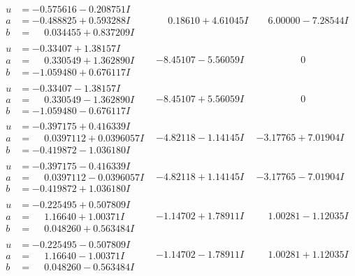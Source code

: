 \documentclass[1p]{elsarticle_modified}
\theoremstyle{definition}
\begin{document}
$$\begin{array}{c|c|c}
\begin{aligned}
u &= -0.575616 - 0.208751 I \\
a &= -0.488825 + 0.593288 I \\
b &= \phantom{-}0.034455 + 0.837209 I\end{aligned}
 & \phantom{-}0.18610 + 4.61045 I & \phantom{-}6.00000 - 7.28544 I \\ \hline\begin{aligned}
u &= -0.33407 + 1.38157 I \\
a &= \phantom{-}0.330549 + 1.362890 I \\
b &= -1.059480 + 0.676117 I\end{aligned}
 & -8.45107 - 5.56059 I & \phantom{-0.000000 } 0 \\ \hline\begin{aligned}
u &= -0.33407 - 1.38157 I \\
a &= \phantom{-}0.330549 - 1.362890 I \\
b &= -1.059480 - 0.676117 I\end{aligned}
 & -8.45107 + 5.56059 I & \phantom{-0.000000 } 0 \\ \hline\begin{aligned}
u &= -0.397175 + 0.416339 I \\
a &= \phantom{-}0.0397112 + 0.0396057 I \\
b &= -0.419872 - 1.036180 I\end{aligned}
 & -4.82118 - 1.14145 I & -3.17765 + 7.01904 I \\ \hline\begin{aligned}
u &= -0.397175 - 0.416339 I \\
a &= \phantom{-}0.0397112 - 0.0396057 I \\
b &= -0.419872 + 1.036180 I\end{aligned}
 & -4.82118 + 1.14145 I & -3.17765 - 7.01904 I \\ \hline\begin{aligned}
u &= -0.225495 + 0.507809 I \\
a &= \phantom{-}1.16640 + 1.00371 I \\
b &= \phantom{-}0.048260 + 0.563484 I\end{aligned}
 & -1.14702 + 1.78911 I & \phantom{-}1.00281 - 1.12035 I \\ \hline\begin{aligned}
u &= -0.225495 - 0.507809 I \\
a &= \phantom{-}1.16640 - 1.00371 I \\
b &= \phantom{-}0.048260 - 0.563484 I\end{aligned}
 & -1.14702 - 1.78911 I & \phantom{-}1.00281 + 1.12035 I \\ \hline\begin{aligned}

\end{aligned}
\end{array}$$
\end{document}
